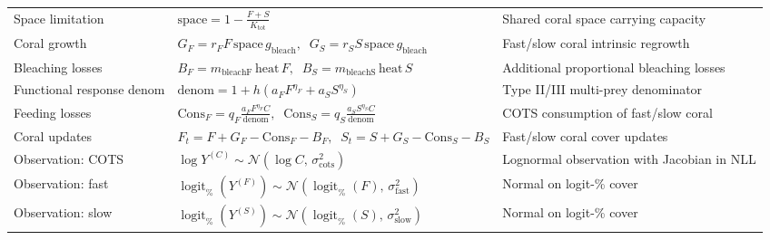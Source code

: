 \begin{landscape}
\begin{table}[ht]
\begin{tabularx}{1.0\linewidth}{l p{10cm} p{10cm}}
Space limitation & $\mathrm{space}=1-\frac{F+S}{K_{\text{tot}}}$ & Shared coral space carrying capacity \\ 
Coral growth & $G_F=r_F F\,\mathrm{space}\,g_{\text{bleach}},\;\; G_S=r_S S\,\mathrm{space}\,g_{\text{bleach}}$ & Fast/slow coral intrinsic regrowth \\ 
Bleaching losses & $B_F=m_{\text{bleachF}}\,\mathrm{heat}\,F,\;\; B_S=m_{\text{bleachS}}\,\mathrm{heat}\,S$ & Additional proportional bleaching losses \\ 
Functional response denom & $\mathrm{denom}=1+h( a_F F^{\eta_F}+a_S S^{\eta_S})$ & Type II/III multi-prey denominator \\ 
Feeding losses & $\mathrm{Cons}_F=q_F\frac{a_F F^{\eta_F} C}{\mathrm{denom}},\;\; \mathrm{Cons}_S=q_S\frac{a_S S^{\eta_S} C}{\mathrm{denom}}$ & COTS consumption of fast/slow coral \\ 
Coral updates & $F_t=F+G_F-\mathrm{Cons}_F-B_F,\;\; S_t=S+G_S-\mathrm{Cons}_S-B_S$ & Fast/slow coral cover updates \\ 
Observation: COTS & $\log Y^{(C)}\sim\mathcal{N}(\log C,\, \sigma_{\text{cots}}^2)$ & Lognormal observation with Jacobian in NLL \\ 
Observation: fast & $\operatorname{logit}_{\%}(Y^{(F)})\sim\mathcal{N}(\operatorname{logit}_{\%}(F),\, \sigma_{\text{fast}}^2)$ & Normal on logit-\% cover \\ 
Observation: slow & $\operatorname{logit}_{\%}(Y^{(S)})\sim\mathcal{N}(\operatorname{logit}_{\%}(S),\, \sigma_{\text{slow}}^2)$ & Normal on logit-\% cover \\ 
\bottomrule
\end{tabularx}
\end{table}
\end{landscape}
